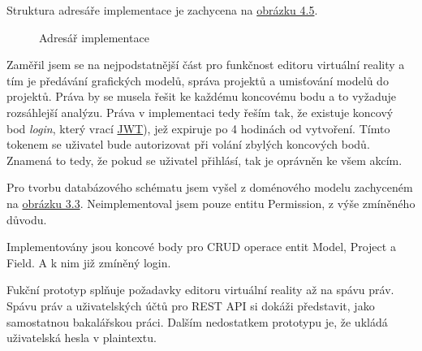 \documentclass[thesis=B,czech]{FITthesis}[2012/06/26]
\begin{document}
        Struktura adresáře implementace je zachycena na \hyperref[fig:adresar]{obrázku 4.5}.
        \begin{figure}[h!]
            \label{fig:adresar}
            \caption{Adresář implementace}
        \end{figure}

		Zaměřil jsem se na nejpodstatnější část pro funkčnost editoru virtuální reality a tím je předávání grafických modelů, správa projektů a umisťování modelů do projektů.
		Práva by se musela řešit ke každému koncovému bodu a to vyžaduje rozsáhlejší analýzu. Práva v implementaci tedy řeším tak, že existuje koncový bod \textit{login}, který vrací \hyperref[jwt]{JWT}), jež expiruje po 4 hodinách od vytvoření. Tímto tokenem se uživatel bude autorizovat při volání zbylých koncových bodů.
		Znamená to tedy, že pokud se uživatel přihlásí, tak je oprávněn ke všem akcím.

        Pro tvorbu databázového schématu jsem vyšel z doménového modelu zachyceném na \hyperref[fig:domainModel]{obrázku 3.3}. Neimplementoval jsem pouze entitu Permission, z výše zmíněného důvodu.

        Implementovány jsou koncové body pro CRUD operace entit Model, Project a Field. A k nim již zmíněný login.
        
		
		Fukční prototyp splňuje požadavky editoru virtuální reality až na spávu práv.
		Spávu práv a uživatelských účtů pro REST API si dokáži představit, jako samostatnou bakalářskou práci.
		Dalším nedostatkem prototypu je, že ukládá uživatelská hesla v plaintextu.
\end{document}
